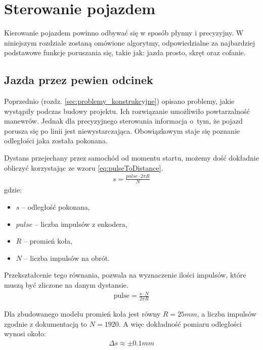 \section{Sterowanie pojazdem}
    Kierowanie pojazdem powinno odbywać się w sposób płynny i precyzyjny.
    W niniejszym rozdziale zostaną omówione algorytmy, odpowiedzialne za najbardziej podstawowe funkcje poruszania się, takie jak: jazda prosto, skręt oraz cofanie.

    \subsection{Jazda przez pewien odcinek}
    \label{subsec:jazda_przez_odcinek}
        Poprzednio (rozdz. \ref{sec:problemy_konstrukcyjne}) opisano problemy, jakie wystąpiły podczas budowy projektu.
        Ich rozwiązanie umożliwiło powtarzalność manewrów.
        Jednak dla precyzyjnego sterowania informacja o~tym, że pojazd porusza się po linii jest niewystarczająca.
        Obowiązkowym staje się poznanie odległości jaka została pokonana.

        Dystans przejechany przez samochód od momentu startu, możemy dość dokładnie obliczyć korzystając ze wzoru \eqref{eq:pulseToDistance}.
        \begin{gather}
            s = \frac{pulse \cdot 2\pi R}{N}
            \label{eq:pulseToDistance}
        \end{gather}
        gdzie:
        \begin{itemize}
            \item $s$ -- odległość pokonana,
            \item $pulse$ -- liczba impulsów z enkodera,
            \item $R$ -- promień koła,
            \item $N$ -- liczba impulsów na obrót.
        \end{itemize}

        Przekształcenie tego równania, pozwala na wyznaczenie ilości impulsów, które muszą być zliczone na danym dystansie.
        \begin{gather}
            \text{pulse} = \frac{s \cdot N}{2\pi R}
            \label{eq:distanceToPulse}
        \end{gather}

        Dla zbudowanego modelu promień koła jest równy $R = 25 mm$, a liczba impulsów zgodnie z dokumentacją to $N = 1920$.
        A więc dokładność pomiaru odległości wynosi około:
        \begin{gather}
            \Delta s \approx \pm0.1mm
        \end{gather}

